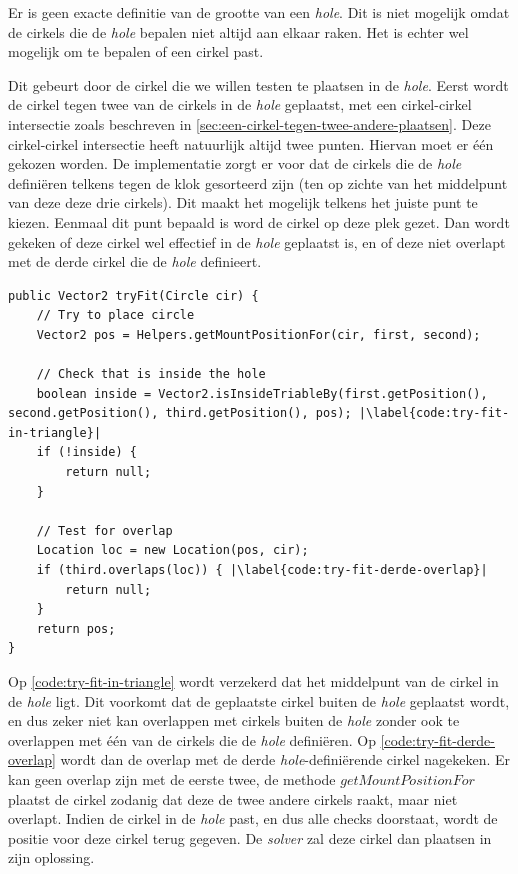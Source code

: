 \documentclass[12pt,a4paper,oneside]{book}
\begin{document}
Er is geen exacte definitie van de grootte van een \textit{hole}.
Dit is niet mogelijk omdat de cirkels die de \textit{hole} bepalen niet altijd aan elkaar raken.
Het is echter wel mogelijk om te bepalen of een cirkel past.

Dit gebeurt door de cirkel die we willen testen te plaatsen in de \textit{hole}.
Eerst wordt de cirkel tegen twee van de cirkels in de \textit{hole} geplaatst, met een cirkel-cirkel intersectie zoals beschreven in \autoref{sec:een-cirkel-tegen-twee-andere-plaatsen}.
Deze cirkel-cirkel intersectie heeft natuurlijk altijd twee punten.
Hiervan moet er één gekozen worden.
De implementatie zorgt er voor dat de cirkels die de \textit{hole} definiëren telkens tegen de klok gesorteerd zijn (ten op zichte van het middelpunt van deze deze drie cirkels).
Dit maakt het mogelijk telkens het juiste punt te kiezen.
Eenmaal dit punt bepaald is word de cirkel op deze plek gezet.
Dan wordt gekeken of deze cirkel wel effectief in de \textit{hole} geplaatst is, en of deze niet overlapt met de derde cirkel die de \textit{hole} definieert.

\begin{lstlisting}
public Vector2 tryFit(Circle cir) {
	// Try to place circle
	Vector2 pos = Helpers.getMountPositionFor(cir, first, second);

	// Check that is inside the hole
	boolean inside = Vector2.isInsideTriableBy(first.getPosition(), second.getPosition(), third.getPosition(), pos); |\label{code:try-fit-in-triangle}|
	if (!inside) {
		return null;
	}

	// Test for overlap
	Location loc = new Location(pos, cir);
	if (third.overlaps(loc)) { |\label{code:try-fit-derde-overlap}|
		return null;
	}
	return pos;
}
\end{lstlisting}

Op \autoref{code:try-fit-in-triangle} wordt verzekerd dat het middelpunt van de cirkel in de \textit{hole} ligt.
Dit voorkomt dat de geplaatste cirkel buiten de \textit{hole} geplaatst wordt, en dus zeker niet kan overlappen met cirkels buiten de \textit{hole} zonder ook te overlappen met één van de cirkels die de \textit{hole} definiëren.
Op \autoref{code:try-fit-derde-overlap} wordt dan de overlap met de derde \textit{hole}-definiërende cirkel nagekeken.
Er kan geen overlap zijn met de eerste twee, de methode $getMountPositionFor$ plaatst de cirkel zodanig dat deze de twee andere cirkels raakt, maar niet overlapt.
Indien de cirkel in de \textit{hole} past, en dus alle checks doorstaat, wordt de positie voor deze cirkel terug gegeven.
De \textit{solver} zal deze cirkel dan plaatsen in zijn oplossing.
\end{document}
